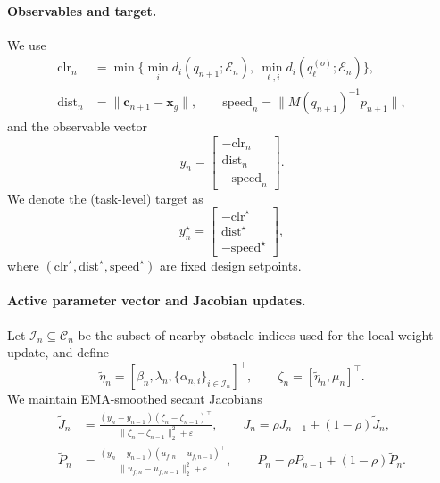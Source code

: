 \documentclass{article} %
\let\vec=\boldsymbol
\begin{document}
\paragraph{Observables and target.}
We use
\begin{align}
\label{eq:impl:observables}
\mathrm{clr}_n &= \min\Big\{\min_i d_i(q_{n+1};\mathcal{E}_n),\ \min_{\ell,i} d_i(q_\ell^{(o)};\mathcal{E}_n)\Big\},\\
\mathrm{dist}_n &= \|\vec c_{n+1}-\mathbf{x}_g\|,\qquad
\mathrm{speed}_n = \|M(q_{n+1})^{-1}p_{n+1}\|,
\end{align}
and the observable vector
\begin{equation}
\label{eq:impl:observable_vector}
y_n=\begin{bmatrix}-\mathrm{clr}_n\\ \mathrm{dist}_n\\ -\mathrm{speed}_n\end{bmatrix}.
\end{equation}
We denote the (task-level) target as
\begin{equation}
\label{eq:impl:observable_target}
y_n^\star=\begin{bmatrix}-\mathrm{clr}^\star\\ \mathrm{dist}^\star\\ -\mathrm{speed}^\star\end{bmatrix},
\end{equation}
where $(\mathrm{clr}^\star,\mathrm{dist}^\star,\mathrm{speed}^\star)$ are fixed design setpoints.

\paragraph{Active parameter vector and Jacobian updates.}
Let $\mathcal{I}_n\subseteq \mathcal{C}_n$ be the subset of nearby obstacle indices used for the local
weight update, and define
\begin{equation}
\label{eq:impl:active_param_vector}
\tilde\eta_n=[\beta_n,\lambda_n,\{\alpha_{n,i}\}_{i\in\mathcal{I}_n}]^\top,\qquad
\zeta_n=[\tilde\eta_n,\mu_n]^\top.
\end{equation}
We maintain EMA-smoothed secant Jacobians
\begin{align}
\label{eq:impl:secant_J}
\widetilde{J}_n&=\frac{(y_n-y_{n-1})(\zeta_n-\zeta_{n-1})^\top}{\|\zeta_n-\zeta_{n-1}\|_2^2+\varepsilon},\qquad
J_n=\rho J_{n-1}+(1-\rho)\widetilde{J}_n,\\
\label{eq:impl:secant_P}
\widetilde{P}_n&=\frac{(y_n-y_{n-1})(u_{f,n}-u_{f,n-1})^\top}{\|u_{f,n}-u_{f,n-1}\|_2^2+\varepsilon},\qquad
P_n=\rho P_{n-1}+(1-\rho)\widetilde{P}_n.
\end{align}
\end{document}

